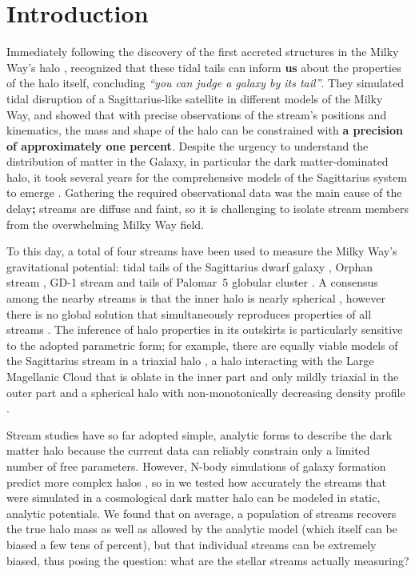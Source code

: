 \documentclass[modern]{aastex62}
\begin{document}

\section{Introduction} \label{sec:intro}
Immediately following the discovery of the first accreted structures in the Milky Way's halo \citep{ibata1994, ti1998}, \citet{johnston1999} recognized that these tidal tails can inform {\bf us} about the properties of the halo itself, concluding \emph{``you can judge a galaxy by its tail''}.
They simulated tidal disruption of a Sagittarius-like satellite in different models of the Milky Way, and showed that with precise observations of the stream's positions and kinematics, the mass and shape of the halo can be constrained with {\bf a precision of approximately one percent}.
Despite the urgency to understand the distribution of matter in the Galaxy, in particular the dark matter-dominated halo, it took several years for the comprehensive models of the Sagittarius system to emerge \citep{helmi2004, johnston2005, lm10}.
Gathering the required observational data was the main cause of the delay{\bf ;} streams are diffuse and faint, so it is challenging to isolate stream members from the overwhelming Milky Way field.

To this day, a total of four streams have been used to measure the Milky Way's gravitational potential: tidal tails of the Sagittarius dwarf galaxy \citep{lm10,gibbons2014,dl2017}, Orphan stream \citep{newberg2010}, GD-1 stream \citep{koposov2010, bowden2015} and tails of Palomar~5 globular cluster \citep{kupper2015}.
A consensus among the nearby streams is that the inner halo is nearly spherical \citep{bovy2016}, however there is no global solution that simultaneously reproduces properties of all streams \citep{pearson2015}.
The inference of halo properties in its outskirts is particularly sensitive to the adopted parametric form; for example, there are equally viable models of the Sagittarius stream in a triaxial halo \citep{lm10}, a halo interacting with the Large Magellanic Cloud that is oblate in the inner part and only mildly triaxial in the outer part \citep{vch2013} and a spherical halo with non-monotonically decreasing density profile \citep{ibata2013}. 

Stream studies have so far adopted simple, analytic forms to describe the dark matter halo because the current data can reliably constrain only a limited number of free parameters.
However, N-body simulations of galaxy formation predict more complex halos \citep[e.g.,][]{diemand2007,springel2008,wetzel2016}, 
so in \citet{bonaca2014} we tested how accurately the streams that were simulated in a cosmological dark matter halo can be modeled in static, analytic potentials.
We found that on average, a population of streams recovers the true halo mass as well as allowed by the analytic model (which itself can be biased a few tens of percent), but that individual streams can be extremely biased, thus posing the question: what are the stellar streams actually measuring?
\end{document}
